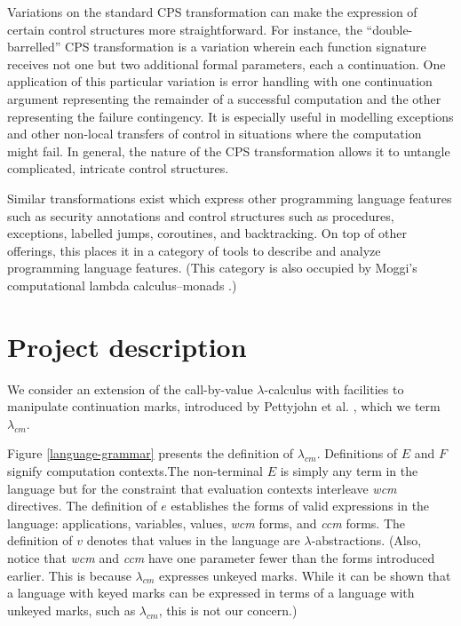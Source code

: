 \documentclass[ms]{byuprop}
\newcounter{definition}
\begin{document}
Variations on the standard CPS transformation can make the expression of certain 
control structures more straightforward. For instance, the ``double-barrelled'' 
CPS transformation is a variation wherein each function signature receives not 
one but two additional formal parameters, each a continuation. One application 
of this particular variation is error handling with one continuation argument 
representing the remainder of a successful computation and the other representing 
the failure contingency. It is especially useful in modelling exceptions and 
other non-local transfers of control in situations where the computation might fail.
In general, the nature of the CPS transformation allows it to untangle 
complicated, intricate control structures.

Similar transformations exist which express other programming language features 
such as security annotations \cite{wallach2000safkasi} and control structures 
such as procedures, exceptions, labelled jumps, coroutines, and 
backtracking. On top of other offerings, this places it in a category of tools 
to describe and analyze programming language features. (This category is also 
occupied by Moggi's computational lambda calculus--monads 
\cite{moggi1989computational}.)

\section{Project description}

We consider an extension of the call-by-value $\lambda$-calculus with 
facilities to manipulate continuation marks, introduced by Pettyjohn et al. 
\cite{pettyjohn2005continuations}, which we term $\lambda_{cm}$.

Figure \ref{language-grammar} presents the definition of $\lambda_{cm}$. 
Definitions of $E$ and $F$ signify computation contexts.The non-terminal 
$E$ is simply any term in the language but for the constraint that evaluation 
contexts interleave \emph{wcm} directives. The definition of $e$ establishes 
the forms of valid expressions in the language: applications, variables, 
values, \emph{wcm} forms, and \emph{ccm} forms. The definition of $v$ denotes 
that values in the language are $\lambda$-abstractions. (Also, notice that 
\emph{wcm} and \emph{ccm} have one parameter fewer than the forms introduced 
earlier. This is because $\lambda_{cm}$ expresses unkeyed marks. While it can 
be shown that a language with keyed marks can be expressed in terms of a 
language with unkeyed marks, such as $\lambda_{cm}$, this is not our concern.) 
\end{document}
